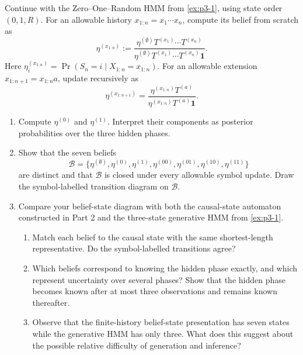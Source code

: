 \begin{exercise}
\label{ex:p3-2}
  Continue with the Zero--One--Random HMM from \cref{ex:p3-1}, using state order
  $(0,1,R)$. For an allowable history $x_{1:n}=x_1\cdots x_n$, compute its
  belief from scratch as
  \[
    \eta^{(x_{1:n})}
      :=\frac{\eta^{(\emptyset)}T^{(x_1)}\cdots T^{(x_n)}}
        {\eta^{(\emptyset)}T^{(x_1)}\cdots T^{(x_n)}\mathbf 1}.
  \]
  Here $\eta_i^{(x_{1:n})}=\Pr(S_n=i\mid X_{1:n}=x_{1:n})$. For an allowable
  extension $x_{1:n+1}=x_{1:n}a$, update recursively as
  \[
    \eta^{(x_{1:n+1})}
      =\frac{\eta^{(x_{1:n})}T^{(a)}}
        {\eta^{(x_{1:n})}T^{(a)}\mathbf 1}.
  \]

  \begin{enumerate}
    \item Compute $\eta^{(0)}$ and $\eta^{(1)}$. Interpret their components
      as posterior probabilities over the three hidden phases.

    \item Show that the seven beliefs
      \[
        \mathcal B=
        \bigl\{
          \eta^{(\emptyset)},\eta^{(0)},\eta^{(1)},\eta^{(00)},
          \eta^{(01)},\eta^{(10)},\eta^{(11)}
        \bigr\}
      \]
      are distinct and that $\mathcal B$ is closed under every allowable
      symbol update. Draw the symbol-labelled transition diagram on
      $\mathcal B$.

    \item Compare your belief-state diagram with both the causal-state
      automaton constructed in Part 2 and the three-state generative HMM from
      \cref{ex:p3-1}.
      \begin{enumerate}
        \item Match each belief to the causal state with the same
          shortest-length representative. Do the symbol-labelled transitions
          agree?

        \item Which beliefs correspond to knowing the hidden phase exactly,
          and which represent uncertainty over several phases? Show that the
          hidden phase becomes known after at most three observations and
          remains known thereafter.

        \item Observe that the finite-history belief-state presentation has
          seven states while the generative HMM has only three. What does this
          suggest about the possible relative difficulty of generation and
          inference?
      \end{enumerate}


\end{enumerate}
\end{exercise}

